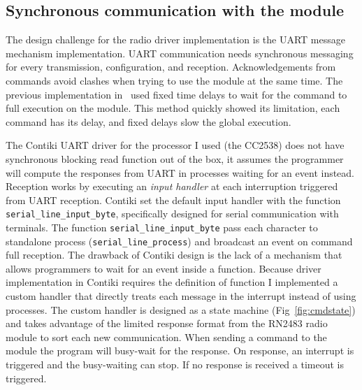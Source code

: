 \subsection{Synchronous communication with the module}

The design challenge for the radio driver implementation is the
UART message mechanism implementation.
UART communication needs synchronous messaging for every
transmission, configuration, and reception.
Acknowledgements from commands avoid
clashes when trying to use the module at the same time.
The previous implementation in~\cite{8847137} used fixed time delays to
wait for the command to full execution on the module. This method
quickly showed its limitation, each command has its delay, and
fixed delays slow the global execution.

The Contiki UART driver for the processor I used (the CC2538) does not have synchronous
blocking read function out of the box, it assumes the programmer will compute the
responses from UART in processes waiting for an event instead.
Reception works by executing an \emph{input handler} at each interruption
triggered from UART reception.
Contiki set the default input handler with the function
\lstinline{serial_line_input_byte},
specifically designed for serial communication with terminals.
The function \lstinline{serial_line_input_byte} pass each character to standalone
process (\lstinline{serial_line_process}) and broadcast an event on command
full reception.
The drawback of Contiki design is the lack of a mechanism that allows programmers
to wait for an event inside a function.
Because driver implementation in Contiki requires the definition of function
I implemented a custom handler that directly treats each message in the
interrupt instead of using processes.
The custom handler is designed as a state machine (Fig~\ref{fig:cmdstate}) and
takes advantage of the limited response
format from the RN2483 radio module to sort each new communication.
When sending a command to the module the program will busy-wait for the
response. On response, an interrupt is triggered and the busy-waiting can stop.
If no response is received a timeout is triggered.


